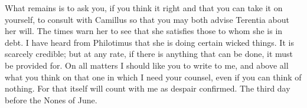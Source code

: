  What remains is to ask you, if you think it right and that you can take it on yourself, to consult with Camillus so that you may both advise Terentia about her will. The times warn her to see that she satisfies those to whom she is in debt. I have heard from Philotimus that she is doing certain wicked things. It is scarcely credible; but at any rate, if there is anything that can be done, it must be provided for. On all matters I should like you to write to me, and above all what you think on that one in which I need your counsel, even if you can think of nothing. For that itself will count with me as despair confirmed. The third day before the Nones of June.
